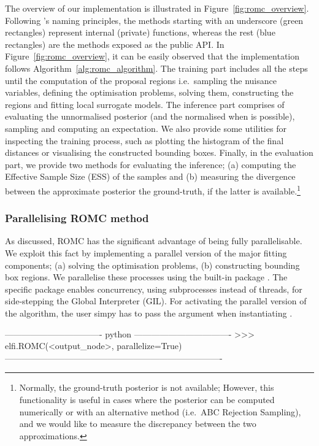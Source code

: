 

The overview of our implementation is illustrated in
Figure~\ref{fig:romc_overview}. Following 's naming
principles, the methods starting with an underscore (green rectangles)
represent internal (private) functions, whereas the rest (blue
rectangles) are the methods exposed as the public API. In
Figure~\ref{fig:romc_overview}, it can be easily observed that the
implementation follows Algorithm~\ref{alg:romc_algorithm}. The
training part includes all the steps until the computation of the
proposal regions i.e.~sampling the nuisance variables, defining the
optimisation problems, solving them, constructing the regions and
fitting local surrogate models. The inference part comprises of
evaluating the unnormalised posterior (and the normalised when is
possible), sampling and computing an expectation. We also provide some
utilities for inspecting the training process, such as plotting the
histogram of the final distances or visualising the constructed
bounding boxes. Finally, in the evaluation part, we provide two
methods for evaluating the inference; (a) computing the Effective
Sample Size (ESS) of the samples and (b) measuring the divergence
between the approximate posterior the ground-truth, if the latter is
available.\footnote{Normally, the ground-truth posterior is not
  available; However, this functionality is useful in cases where the
  posterior can be computed numerically or with an alternative method
  (i.e.\ ABC Rejection Sampling), and we would like to measure the
  discrepancy between the two approximations.}

\subsubsection*{Parallelising ROMC method}

As discussed, ROMC has the significant advantage of being fully
parallelisable. We exploit this fact by implementing a parallel
version of the major fitting components; (a) solving the optimisation
problems, (b) constructing bounding box regions. We parallelise these
processes using the built-in  package
. The specific package enables concurrency, using
subprocesses instead of threads, for side-stepping the Global
Interpreter (GIL). For activating the parallel version of the
algorithm, the user simpy has to pass the argument
 when instantiating .

\begin{Code}
---------------------------------- python ----------------------------------
>>> elfi.ROMC(<output_node>, parallelize=True)
----------------------------------------------------------------------------
\end{Code}
  
